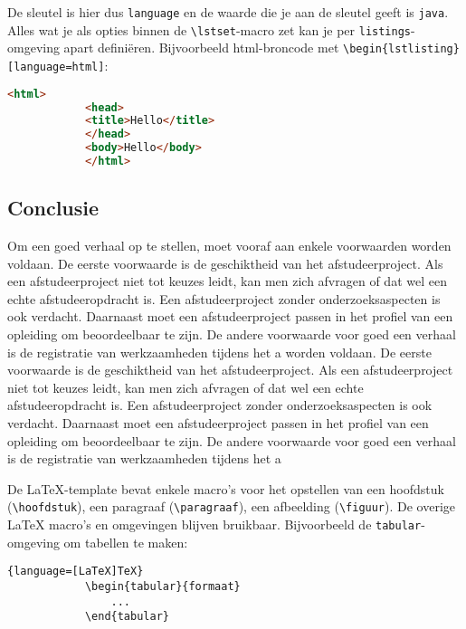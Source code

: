 De sleutel is hier dus \verb!language! en de waarde die je aan de
sleutel geeft is \verb!java!. Alles wat je als opties binnen de
\verb!\lstset!-macro zet kan je per \verb!listings!-omgeving apart
definiëren. Bijvoorbeeld html-broncode met
\verb!\begin{lstlisting}[language=html]!:
	
	\begin{Aanpassen}
		\begin{lstlisting}[language=html]
			<html>
			<head>
			<title>Hello</title>
			</head>
			<body>Hello</body>
			</html>
		\end{lstlisting}
	\end{Aanpassen}
	

	\subsection{Conclusie}
	
	
	
	Om een goed verhaal op te stellen, moet vooraf aan enkele voorwaarden
	worden voldaan. De eerste voorwaarde is de geschiktheid van het
	afstudeerproject. Als een afstudeerproject niet tot keuzes leidt, kan
	men zich afvragen of dat wel een echte afstudeeropdracht is. Een
	afstudeerproject zonder onderzoeksaspecten is ook verdacht. Daarnaast
	moet een afstudeerproject passen in het profiel van een opleiding om
	beoordeelbaar te zijn. De andere voorwaarde voor goed een verhaal is
	de registratie van werkzaamheden tijdens het a
		worden voldaan. De eerste voorwaarde is de geschiktheid van het
		afstudeerproject. Als een afstudeerproject niet tot keuzes leidt, kan
		men zich afvragen of dat wel een echte afstudeeropdracht is. Een
		afstudeerproject zonder onderzoeksaspecten is ook verdacht. Daarnaast
		moet een afstudeerproject passen in het profiel van een opleiding om
		beoordeelbaar te zijn. De andere voorwaarde voor goed een verhaal is
		de registratie van werkzaamheden tijdens het a
		
		
		
		De \LaTeX{}-template bevat enkele macro's voor het opstellen van een
		hoofdstuk (\verb!\hoofdstuk!), een paragraaf (\verb!\paragraaf!), een
		afbeelding (\verb!\figuur!). De overige \LaTeX{} macro's en omgevingen
		blijven bruikbaar. Bijvoorbeeld de \verb!tabular!-omgeving om tabellen
		te maken:
		
		\begin{lstlisting}{language=[LaTeX]TeX}
			\begin{tabular}{formaat}
				... 
			\end{tabular}
		\end{lstlisting}
		
